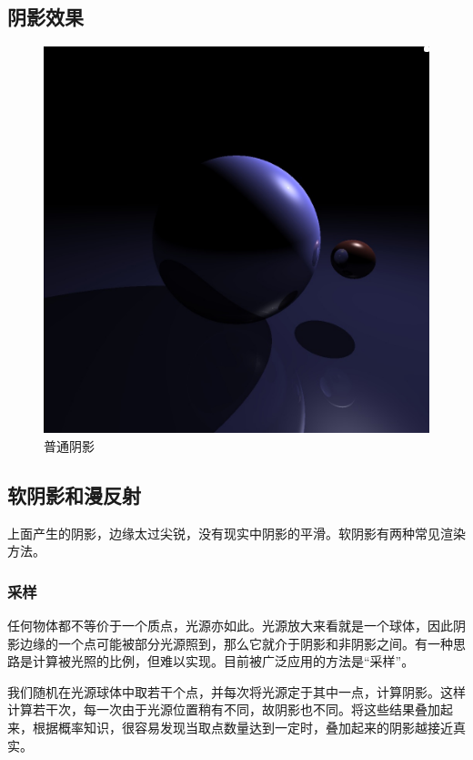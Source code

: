 \documentclass[10pt,twocolumn]{article}
\begin{document}
\subsection{\hei 阴影效果}
\begin{figure}[ht]
\centering
\includegraphics[scale=.2]{fig5.jpg}
\caption{普通阴影}
\end{figure}

\newpage

\subsection{\hei 软阴影和漫反射}
上面产生的阴影，边缘太过尖锐，没有现实中阴影的平滑。软阴影有两种常见渲染方法。
\subsubsection{\hei 采样}
任何物体都不等价于一个质点，光源亦如此。光源放大来看就是一个球体，因此阴影边缘的一个点可能被部分光源照到，那么它就介于阴影和非阴影之间。有一种思路是计算被光照的比例，但难以实现。目前被广泛应用的方法是“采样”。

我们随机在光源球体中取若干个点，并每次将光源定于其中一点，计算阴影。这样计算若干次，每一次由于光源位置稍有不同，故阴影也不同。将这些结果叠加起来，根据概率知识，很容易发现当取点数量达到一定时，叠加起来的阴影越接近真实。
\end{document}
